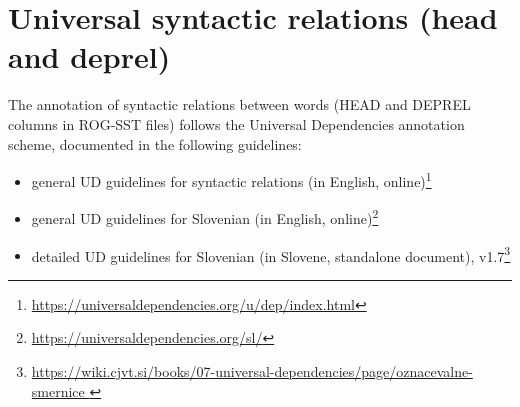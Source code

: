 \documentclass[a4paper,oneside,12pt]{article}
\begin{document}
\section{Universal syntactic relations (head and deprel)}
The annotation of syntactic relations between words (HEAD and DEPREL columns in
ROG-SST files) follows the Universal Dependencies annotation scheme, documented
in the following guidelines:
\begin{itemize}
  \item general UD guidelines for syntactic relations (in English,
        online)\footnote{\url{https://universaldependencies.org/u/dep/index.html}}
  \item general UD guidelines for Slovenian (in English, online)\footnote{
          \url{https://universaldependencies.org/sl/}}
  \item detailed UD guidelines for Slovenian (in Slovene, standalone document),
        v1.7\footnote{
          \url{https://wiki.cjvt.si/books/07-universal-dependencies/page/oznacevalne-smernice
          }}
\end{itemize}
\end{document}
